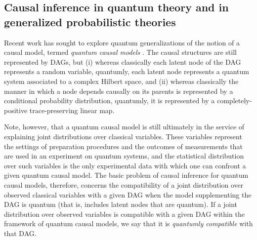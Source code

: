 


\color{black}


\subsection{Causal inference in quantum theory and in generalized probabilistic theories\label{sec:classicallity}}



Recent work has sought to explore quantum generalizations of the notion of a causal model, termed {\em quantum causal models} \cite{pusey2014gdag,Chaves2015infoquantum}.  The causal structures are still represented by DAGs, but (i) whereas classically each latent node of the DAG represents a random variable, quantumly, each latent node represents a quantum system associated to a complex Hilbert space, and (ii) whereas classically the manner in which a node depends causally on its parents is 
 represented by a conditional probability distribution, quantumly, it is represented by a completely-positive trace-preserving linear map.

Note, however, that a quantum causal model is still ultimately in the service of explaining joint distributions over classical variables.  These variables represent the settings of preparation procedures and the outcomes of measurements that are used in an experiment on quantum systems, and the statistical distribution over such variables is the only experimental data with which one can confront a given quantum causal model.  The basic problem of causal inference for quantum causal models, therefore, concerns the compatibility of a joint distribution over observed classical variables with a given DAG when the model supplementing the DAG is quantum (that is, includes latent nodes that are quantum).  If a joint distribution over observed variables is compatible with a given DAG within the framework of quantum causal models, we say that it is {\em quantumly compatible} with that DAG.  
 
